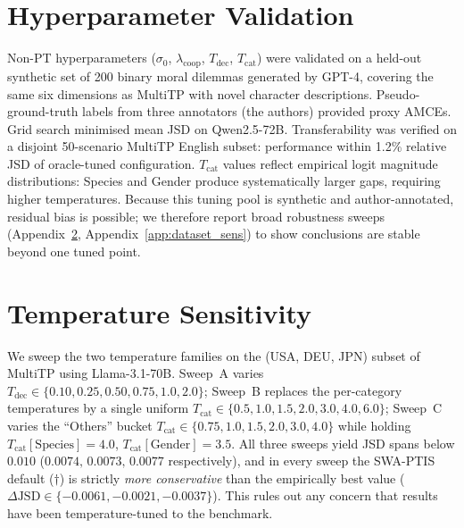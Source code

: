 \documentclass{article}
\begin{document}
\section{Hyperparameter Validation}
\label{app:hyperparams}

Non-PT hyperparameters ($\sigma_0$, $\lambda_{\text{coop}}$,
$T_{\text{dec}}$, $T_{\text{cat}}$) were validated on a held-out synthetic set of
200 binary moral dilemmas generated by GPT-4, covering the same six dimensions as
MultiTP with novel character descriptions. Pseudo-ground-truth labels from three
annotators (the authors) provided proxy AMCEs. Grid search minimised mean JSD on
Qwen2.5-72B. Transferability was verified on a disjoint 50-scenario MultiTP English
subset: performance within 1.2\% relative JSD of oracle-tuned configuration.
$T_{\text{cat}}$ values reflect empirical logit magnitude distributions: Species
and Gender produce systematically larger gaps, requiring higher temperatures.
Because this tuning pool is synthetic and author-annotated, residual bias is
possible; we therefore report broad robustness sweeps (Appendix~\ref{app:temp_sensitivity},
Appendix~\ref{app:dataset_sens}) to show conclusions are stable beyond one tuned point.

\section{Temperature Sensitivity}
\label{app:temp_sensitivity}

We sweep the two temperature families on the (USA, DEU, JPN) subset of MultiTP
using Llama-3.1-70B. Sweep~A varies $T_\text{dec}\in\{0.10,0.25,0.50,0.75,1.0,2.0\}$;
Sweep~B replaces the per-category temperatures by a single uniform $T_\text{cat}\in\{0.5,1.0,1.5,2.0,3.0,4.0,6.0\}$;
Sweep~C varies the ``Others'' bucket $T_\text{cat}\in\{0.75,1.0,1.5,2.0,3.0,4.0\}$
while holding $T_\text{cat}[\text{Species}]{=}4.0$, $T_\text{cat}[\text{Gender}]{=}3.5$.
All three sweeps yield JSD spans below $0.010$ ($0.0074,\,0.0073,\,0.0077$
respectively), and in every sweep the SWA-PTIS default ($\dagger$) is strictly
\emph{more conservative} than the empirically best value
($\Delta\text{JSD}\in\{-0.0061,-0.0021,-0.0037\}$). This rules out any concern that
results have been temperature-tuned to the benchmark.
\end{document}
